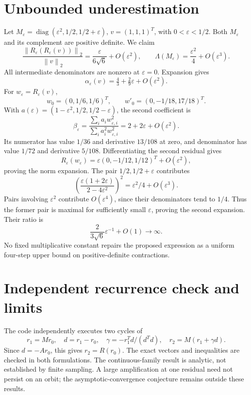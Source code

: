 \documentclass[11pt]{article}
\newcommand{\norm}[1]{\left\lVert#1\right\rVert}
\newcommand{\diag}{\operatorname{diag}}
\begin{document}
\section{Unbounded underestimation}
Let $M_\varepsilon=\diag(\varepsilon^2,1/2,1/2+\varepsilon)$, $v=(1,1,1)^T$, with $0<\varepsilon<1/2$. Both $M_\varepsilon$ and its complement are positive definite. We claim
\[
\frac{\norm{R_\varepsilon(R_\varepsilon(v))}_2}{\norm v_2}=\frac{\varepsilon}{6\sqrt6}+O(\varepsilon^2),
\qquad \Lambda(M_\varepsilon)=\frac{\varepsilon^2}{4}+O(\varepsilon^3).
\]
All intermediate denominators are nonzero at $\varepsilon=0$. Expansion gives
\[
\alpha_\varepsilon(v)=\tfrac43+\tfrac29\varepsilon+O(\varepsilon^2).
\]
For $w_\varepsilon=R_\varepsilon(v)$,
\[w_0=(0,1/6,1/6)^T,\qquad w'_0=(0,-1/18,17/18)^T.\]
With $a(\varepsilon)=(1-\varepsilon^2,1/2,1/2-\varepsilon)$, the second coefficient is
\[
\beta_\varepsilon=\frac{\sum_i a_iw_{\varepsilon,i}^2}{\sum_i a_i^2w_{\varepsilon,i}^2}=2+2\varepsilon+O(\varepsilon^2).
\]
Its numerator has value $1/36$ and derivative $13/108$ at zero, and denominator has value $1/72$ and derivative $5/108$. Differentiating the second residual gives
\[
R_\varepsilon(w_\varepsilon)=\varepsilon(0,-1/12,1/12)^T+O(\varepsilon^2),
\]
proving the norm expansion. The pair $1/2,1/2+\varepsilon$ contributes
\[
\left(\frac{\varepsilon(1+2\varepsilon)}{2-4\varepsilon^2}\right)^2=\varepsilon^2/4+O(\varepsilon^3).
\]
Pairs involving $\varepsilon^2$ contribute $O(\varepsilon^4)$, since their denominators tend to $1/4$. Thus the former pair is maximal for sufficiently small $\varepsilon$, proving the second expansion. Their ratio is
\[\boxed{\frac{2}{3\sqrt6}\varepsilon^{-1}+O(1)\longrightarrow\infty.}\]
No fixed multiplicative constant repairs the proposed expression as a uniform four-step upper bound on positive-definite contractions.
\section{Independent recurrence check and limits}
The code independently executes two cycles of
\[
r_1=Mr_0,\quad d=r_1-r_0,\quad\gamma=-r_1^Td/(d^Td),\quad r_2=M(r_1+\gamma d).
\]
Since $d=-Ar_0$, this gives $r_2=R(r_0)$. The exact vectors and inequalities are checked in both formulations. The continuous-family result is analytic, not established by finite sampling. A large amplification at one residual need not persist on an orbit; the asymptotic-convergence conjecture remains outside these results.
\end{document}
